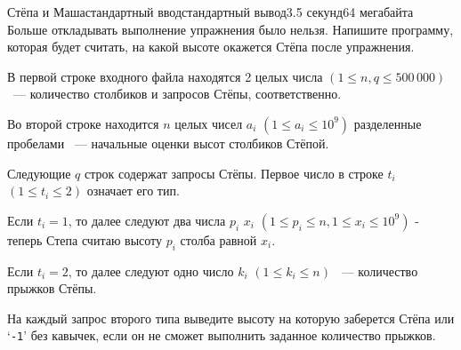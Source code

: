 \begin{problem}{Стёпа и Маша}{стандартный ввод}{стандартный вывод}{3.5 секунд}{64 мегабайта}
Больше откладывать выполнение упражнения было нельзя. Напишите программу, которая будет считать, на какой высоте окажется Стёпа после упражнения.

\InputFile
В первой строке входного файла находятся 2 целых числа $(1 \leq n, q \leq 500\,000)$ ~--- количество столбиков и запросов Стёпы, соответственно.

Во второй строке находится $n$ целых чисел $a_i$ $(1 \leq a_i \leq 10^9)$ разделенные пробелами ~--- начальные оценки высот столбиков Стёпой.

Следующие $q$ строк содержат запросы Стёпы. Первое число в строке $t_i$ $(1 \leq t_i \leq 2)$ означает его тип.

Если $t_i = 1$, то далее следуют два числа $p_i$ $x_i$ $(1 \leq p_i \leq n, 1 \leq x_i \leq 10^9)$ - теперь Степа считаю высоту $p_i$ столба равной $x_i$.

Если $t_i = 2$, то далее следуют одно число $k_i$ $(1 \leq k_i \leq n)$ ~--- количество прыжков Стёпы.

\OutputFile
На каждый запрос второго типа выведите высоту на которую заберется Стёпа или `\texttt{-1}' без кавычек, если он не сможет выполнить заданное количество прыжков.

\Example

\begin{example}
%
\end{example}

\end{problem}

